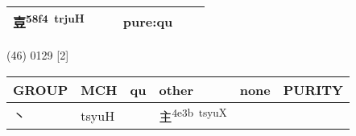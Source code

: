 \documentclass[14pt,a4paper]{scrartcl}
\begin{document}
\begin{longtable}[c]{@{}llllll@{}}
\begin{minipage}[t]{0.14\columnwidth}\raggedright\strut
壴\textsuperscript{58f4~trjuH}
\strut\end{minipage} &
\begin{minipage}[t]{0.14\columnwidth}\raggedright\strut
\strut\end{minipage} &
\begin{minipage}[t]{0.14\columnwidth}\raggedright\strut
\strut\end{minipage} &
\begin{minipage}[t]{0.14\columnwidth}\raggedright\strut
pure:qu
\strut\end{minipage}\tabularnewline
\bottomrule
\end{longtable}

(46) 0129 {[}2{]}

\begin{longtable}[c]{@{}llllll@{}}
\toprule
\begin{minipage}[b]{0.14\columnwidth}\raggedright\strut
GROUP
\strut\end{minipage} &
\begin{minipage}[b]{0.14\columnwidth}\raggedright\strut
MCH
\strut\end{minipage} &
\begin{minipage}[b]{0.14\columnwidth}\raggedright\strut
qu
\strut\end{minipage} &
\begin{minipage}[b]{0.14\columnwidth}\raggedright\strut
other
\strut\end{minipage} &
\begin{minipage}[b]{0.14\columnwidth}\raggedright\strut
none
\strut\end{minipage} &
\begin{minipage}[b]{0.14\columnwidth}\raggedright\strut
PURITY
\strut\end{minipage}\tabularnewline
\midrule
\endhead
\begin{minipage}[t]{0.14\columnwidth}\raggedright\strut
丶
\strut\end{minipage} &
\begin{minipage}[t]{0.14\columnwidth}\raggedright\strut
tsyuH
\strut\end{minipage} &
\begin{minipage}[t]{0.14\columnwidth}\raggedright\strut
\strut\end{minipage} &
\begin{minipage}[t]{0.14\columnwidth}\raggedright\strut
主\textsuperscript{4e3b~tsyuX}
\strut\end{minipage} &

\end{longtable}
\end{document}
